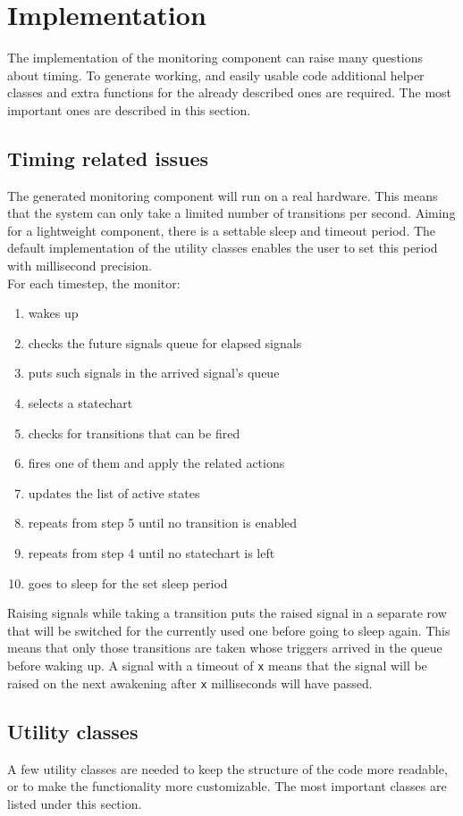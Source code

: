 \section{Implementation}
The implementation of the monitoring component can raise many questions about timing. To generate working, and easily usable code additional helper classes and extra functions for the already described ones are required. The most important ones are described in this section.
  \subsection{Timing related issues}
The generated monitoring component will run on a real hardware. This means that the system can only take a limited number of transitions per second. Aiming for a lightweight component, there is a settable sleep and timeout period. The default implementation of the utility classes enables the user to set this period with millisecond precision.\\
For each timestep, the monitor:
\begin{enumerate}
  \item wakes up
  \item checks the future signals queue for elapsed signals
  \item puts such signals in the arrived signal's queue
  \item selects a statechart
  \item checks for transitions that can be fired
  \item fires one of them and apply the related actions
  \item updates the list of active states
  \item repeats from step 5 until no transition is enabled
  \item repeats from step 4 until no statechart is left
  \item goes to sleep for the set sleep period
\end{enumerate}
Raising signals while taking a transition puts the raised signal in a separate row that will be switched for the currently used one before going to sleep again. This means that only those transitions are taken whose triggers arrived in the queue before waking up. A signal with a timeout of \verb!x! means that the signal will be raised on the next awakening after \verb!x! milliseconds will have passed.
  \subsection{Utility classes}
A few utility classes are needed to keep the structure of the code more readable, or to make the functionality more customizable. The most important classes are listed under this section.
